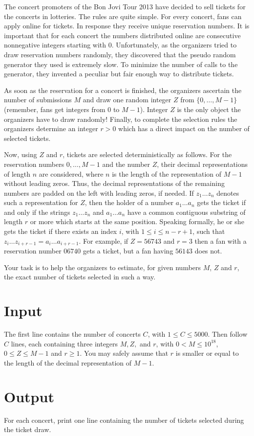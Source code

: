 
The concert promoters of the Bon Jovi Tour 2013 have decided to sell tickets for the concerts in lotteries. The rules are quite simple. For every concert, fans can apply online for tickets. In response they receive unique reservation numbers. It is important that for each concert the numbers distributed online are consecutive nonnegative integers starting with 0. Unfortunately, as the organizers tried to draw reservation numbers randomly, they discovered that the pseudo random generator they used is extremely slow. To minimize the number of calls to the generator, they invented a peculiar but fair enough way to distribute tickets.

As soon as the reservation for a concert is finished, the organizers ascertain the number of submissions $M$ and draw one random integer $Z$ from $\{0, \ldots, M-1\}$ (remember, fans get integers from $0$ to $M-1$). Integer $Z$ is the only object the organizers have to draw randomly! Finally, to complete the selection rules the organizers determine an integer $r>0$ which has a direct impact on the number of selected tickets.

Now, using $Z$ and $r$, tickets are selected deterministically as follows. For the reservation numbers $0, \ldots, M-1$ and the number $Z$, their decimal representations of length $n$ are considered, where $n$ is the length of the representation of $M-1$ without leading zeros. Thus, the decimal representations of the remaining numbers are padded on the left with leading zeros, if needed. If $z_{1}\ldots z_{n}$ denotes such a representation for $Z$, then the holder of a number $a_{1}\ldots a_n$ gets the ticket if and only if the strings  $z_{1}\ldots z_{n}$ and $a_{1}\ldots a_n$ have a common contiguous substring of length $r$ or more which starts at the same position. Speaking formally, he or she gets the ticket if there exists an index $i$, with $1\le i\le n-r+1$, such that $z_i\ldots z_{i+r-1} = a_i \ldots a_{i+r-1}$. For example, if $Z = 56743$ and $r=3$ then a fan with a reservation number $06740$ gets a ticket, but a fan having $56143$ does not.

Your task is to help the organizers to estimate, for given numbers $M$, $Z$ and $r$, the exact number of tickets selected in such a way. 

\section*{Input}
The first line contains the number of concerts $C$, with $1\le C \le 5000$. Then follow $C$ lines, each containing three integers $M, Z,$ and $r$, with $0<M\le 10^{18}$, $0\le Z \le M-1$ and $r\ge 1$. You may safely assume that $r$ is smaller or equal to the length of the decimal representation of $M-1$. 

\section*{Output}
For each concert, print one line containing the number of tickets selected during the ticket draw.
